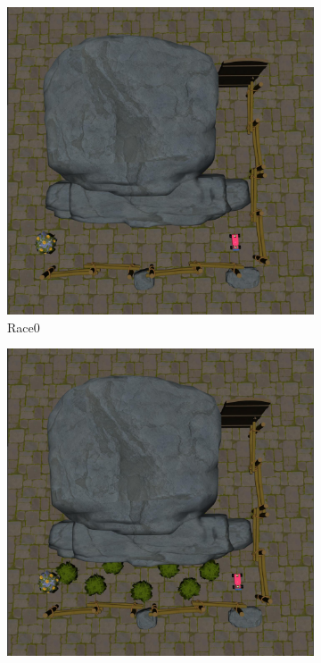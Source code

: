 \documentclass{article}
\begin{document}
\begin{figure}[H]
    \centering
      \begin{subfigure}{0.3\linewidth}
        \centering
        \includegraphics[width=\linewidth]{assets/appendix/race0.pdf}
        \caption{Race0}
      \end{subfigure}
      \begin{subfigure}{0.3\linewidth}
        \centering
        \includegraphics[width=\linewidth]{assets/appendix/race1.pdf}

\end{subfigure}
\end{figure}
\end{document}
